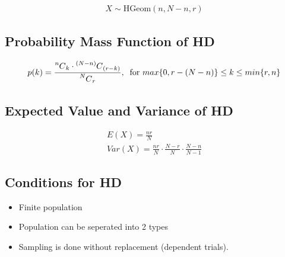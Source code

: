 \documentclass{article}
\newcommand\Mycomb[2][^n]{\prescript{#1\mkern-0.5mu}{}C_{#2}}
\begin{document}
\begin{gather*}
  X \sim \text{HGeom}(n, N-n, r)
\end{gather*}

\subsection{Probability Mass Function of HD}

\begin{gather*}
  p(k) =  \frac{\Mycomb[n]{k} \cdot \Mycomb[(N-n)]{(r-k)}}
  {\Mycomb[N]{r}}, \; \;
  \text{for } max\{ 0, r - (N - n) \} \leq k \leq min\{r, n\}
\end{gather*}

\subsection{Expected Value and Variance of HD}
\begin{gather*}
  E(X) = \frac{nr}{N} \\[5pt]
  Var(X) = \frac{nr}{N} \cdot \frac{N -r}{N} \cdot \frac{N-n}{N-1}
\end{gather*}

\subsection{Conditions for HD}
\begin{itemize}
  \item Finite population
  \item Population can be seperated into 2 types
  \item Sampling is done without replacement (dependent trials).
\end{itemize}
\end{document}
